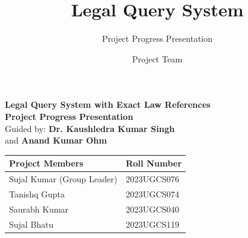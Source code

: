 \documentclass[aspectratio=169]{beamer}
\title{Legal Query System}
\subtitle{Project Progress Presentation}
\author{Project Team}
\begin{document}
\begin{frame}[plain]
  \begin{center}
    \vspace*{0.5cm}
    {\Large \textbf{\textcolor{Primary}{Legal Query System with Exact Law References}}}\\[0.5em]
    {\Large \textbf{\textcolor{Accent}{Project Progress Presentation}}}\\[1em]

    {\small Guided by: \textbf{\textcolor{Good}{Dr. Kaushledra Kumar Singh}}} \\[0.2cm]
    {\small and \textbf{\textcolor{Good}{Anand Kumar Ohm}}}
  \end{center}

  \vfill


  \vfill

  \begin{center}
    \small
    \renewcommand{\arraystretch}{1.2}
    \begin{tabular}{@{}ll@{}}
      \toprule
      \textbf{Project Members} & \textbf{Roll Number} \\
      \midrule
      Sujal Kumar (Group Leader) & 2023UGCS076 \\
      Tanishq Gupta & 2023UGCS074 \\
      Saurabh Kumar & 2023UGCS040 \\
      Sujal Bhatu & 2023UGCS119 \\
      \bottomrule
    \end{tabular}
  \end{center}

  \vfill

\end{frame}
\end{document}

